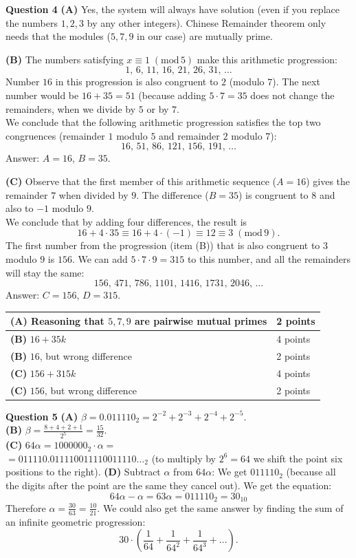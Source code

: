\documentclass[jou]{apa6}
\begin{document}
\vspace{10pt}
{\bf Question 4}
{\bf (A)} Yes, the system will always have solution (even if you replace the numbers $1,2,3$ by 
any other integers). Chinese Remainder theorem only needs that the modules 
($5,7,9$ in our case) are mutually prime.

{\bf (B)} The numbers satisfying $x \equiv 1\;(\text{mod}\,5)$ make this arithmetic progression: 
$$1,\,6,\,11,\,16,\,21,\,26,\,31,\,\ldots$$
Number $16$ in this progression is also congruent to $2$ (modulo $7$). The next number would be 
$16 + 35 = 51$ (because adding $5 \cdot 7 = 35$ does not change the remainders, when 
we divide by $5$ or by $7$.\\
We conclude that the following arithmetic progression satisfies the top two congruences
(remainder $1$ modulo $5$ and remainder $2$ modulo $7$):
$$16,\,51,\,86,\,121,\,156,\,191,\,\ldots$$
Answer: $A = 16$, $B = 35$. 

{\bf (C)} Observe that the first member of this arithmetic sequence ($A = 16$) gives the
remainder $7$ when divided by $9$. The difference ($B = 35$) is congruent to $8$ and also to $-1$ 
modulo $9$.\\
We conclude that by adding four differences, the result is
$$16 + 4 \cdot 35 \equiv 16 + 4 \cdot (-1) \equiv 12 \equiv 3\;(\text{mod}\,9).$$
The first number from the progression (item (B)) that is also congruent to $3$ modulo $9$ is $156$. 
We can add $5 \cdot 7 \cdot 9 = 315$ to this number, and all the remainders will stay the same:
$$156,\,471,\,786,\,1101,\,1416,\,1731,\,2046,\,\ldots$$
Answer: $C = 156$, $D = 315$.

{\footnotesize
\begin{tabular}{|l|l|} \hline
{\bf (A)} Reasoning that $5,7,9$ are pairwise mutual primes & 2 points \\ \hline
{\bf (B)} $16+35k$ & 4 points \\ \hline
{\bf (B)} $16$, but wrong difference & 2 points \\ \hline
{\bf (C)} $156+315k$ & 4 points \\ \hline
{\bf (C)} $156$, but wrong difference & 2 points \\ \hline
\end{tabular}
}

\vspace{10pt}
{\bf Question 5}
{\bf (A)} $\beta = 0.011110_2 = 2^{-2} + 2^{-3} + 2^{-4} + 2^{-5}$.\\
{\bf (B)} $\beta = \frac{8 + 4 + 2 + 1}{2^{5}} = \frac{15}{32}$.\\
{\bf (C)} $64\alpha = 1000000_2 \cdot \alpha =$\\
$= 011110.011110011110011110\ldots_2$ (to multiply 
by $2^6 = 64$ we shift the point six positions to the right).
{\bf (D)} Subtract $\alpha$ from $64\alpha$: We get $011110_2$ (because all the 
digits after the point are the same \textendash{} they cancel out). We get the equation:
$$64\alpha - \alpha = 63\alpha = 011110_2 = 30_{10}$$
Therefore $\alpha = \frac{30}{63} = \frac{10}{21}$. We could also get the
same answer by finding the sum of an infinite geometric progression: 
$$30 \cdot \left( \frac{1}{64} + \frac{1}{64^2} + \frac{1}{64^3} + \ldots{} \right).$$
\end{document}
